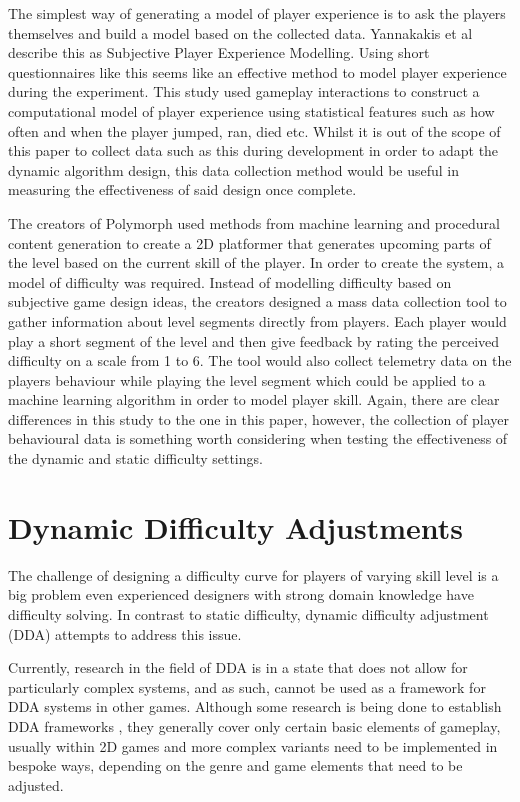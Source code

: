\documentclass[journal]{IEEEtran}
\begin{document}
The simplest way of generating a model of player experience is to ask the players themselves and build a model based on the collected data. Yannakakis et al \cite{yannakakis2012game} describe this as Subjective Player Experience Modelling. Using short questionnaires like this seems like an effective method to model player experience during the experiment. This study \cite{pedersen2009modeling} used gameplay interactions to construct a computational model of player experience using statistical features such as how often and when the player jumped, ran, died etc. Whilst it is out of the scope of this paper to collect data such as this during development in order to adapt the dynamic algorithm design, this data collection method would be useful in measuring the effectiveness of said design once complete.

The creators of Polymorph \cite{jennings2010polymorph} used methods from machine learning and procedural content generation to create a 2D platformer that generates upcoming parts of the level based on the current skill of the player. In order to create the system, a model of difficulty was required. Instead of modelling difficulty based on subjective game design ideas, the creators designed a mass data collection tool to gather information about level segments directly from players. Each player would play a short segment of the level and then give feedback by rating the perceived difficulty on a scale from 1 to 6. The tool would also collect telemetry data on the players behaviour while playing the level segment which could be applied to a machine learning algorithm in order to model player skill. Again, there are clear differences in this study to the one in this paper, however, the collection of player behavioural data is something worth considering when testing the effectiveness of the dynamic and static difficulty settings.



\section{Dynamic Difficulty Adjustments}
The challenge of designing a difficulty curve for players of varying skill level is a big problem even experienced designers with strong domain knowledge have difficulty solving. In contrast to static difficulty, dynamic difficulty adjustment (DDA) attempts to address this issue. 
 
Currently, research in the field of DDA is in a state that does not allow for particularly complex systems, and as such, cannot be used as a framework for DDA systems in other games. Although some research is being done to establish DDA frameworks \cite{zohaib2018dynamic}, they generally cover only certain basic elements of gameplay, usually within 2D games \cite{wheat2013dynamically} and more complex variants need to be implemented in bespoke ways, depending on the genre and game elements that need to be adjusted. 
\end{document}
